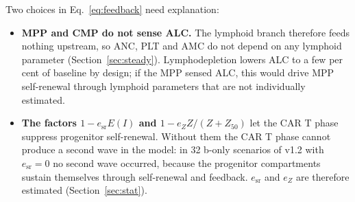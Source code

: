 \documentclass[11pt]{article}
\begin{document}
Two choices in Eq.~\ref{eq:feedback} need explanation:
\begin{itemize}
\item \textbf{MPP and CMP do not sense ALC.} The lymphoid branch therefore feeds nothing upstream, so ANC, PLT and AMC do not depend on any lymphoid parameter (Section~\ref{sec:steady}). Lymphodepletion lowers ALC to a few per cent of baseline by design; if the MPP sensed ALC, this would drive MPP self-renewal through lymphoid parameters that are not individually estimated.
\item \textbf{The factors $1-e_{\mathrm{sr}}E(I)$ and $1-e_Z Z/(Z+Z_{50})$} let the CAR T phase suppress progenitor self-renewal. Without them the CAR T phase cannot produce a second wave in the model: in 32 b-only scenarios of v1.2 with $e_{\mathrm{sr}}=0$ no second wave occurred, because the progenitor compartments sustain themselves through self-renewal and feedback. $e_{\mathrm{sr}}$ and $e_Z$ are therefore estimated (Section~\ref{sec:stat}).
\end{itemize}
\end{document}
